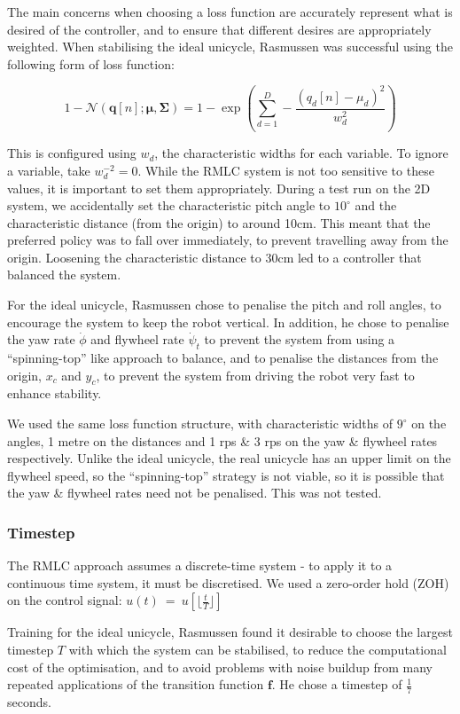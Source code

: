 \documentclass{IIBproject}
\begin{document}
The main concerns when choosing a loss function are accurately represent what
is desired of the controller, and to ensure that different desires are
appropriately weighted. When stabilising the ideal unicycle, Rasmussen was
successful using the following form of loss function:

\[
  1 - \mathcal{N}(\boldsymbol{q}[n]; \boldsymbol{\mu}, \boldsymbol{\Sigma})
  = 1 - \exp\left(\sum_{d=1}^D - \frac{(q_d[n] - \mu_d)^2}{w_d^2}\right)
\]

This is configured using $w_d$, the characteristic widths for each variable.
To ignore a variable, take $w_d^{-2} = 0$. While the RMLC system is not too
sensitive to these values, it is important to set them appropriately. During a
test run on the 2D system, we accidentally set the characteristic pitch angle
to $10^\circ$ and the characteristic distance (from the origin) to around
10cm. This meant that the preferred policy was to fall over immediately, to
prevent travelling away from the origin. Loosening the characteristic distance
to 30cm led to a controller that balanced the system.

For the ideal unicycle, Rasmussen chose to penalise the pitch and roll angles,
to encourage the system to keep the robot vertical.  In addition, he chose to
penalise the yaw rate $\dot{\phi}$ and flywheel rate $\dot{\psi}_t$ to prevent
the system from using a ``spinning-top'' like approach to balance, and to
penalise the distances from the origin, $x_c$ and $y_c$, to prevent the system
from driving the robot very fast to enhance stability.

We used the same loss function structure, with characteristic widths of
$9^\circ$ on the angles, 1 metre on the distances and 1 rps \& 3 rps on the
yaw \& flywheel rates respectively. Unlike the ideal unicycle, the real
unicycle has an upper limit on the flywheel speed, so the ``spinning-top''
strategy is not viable, so it is possible that the yaw \& flywheel rates need
not be penalised. This was not tested.

\subsubsection{Timestep}

The RMLC approach assumes a discrete-time system - to apply it to a continuous
time system, it must be discretised. We used a zero-order hold (ZOH) on the
control signal: $u(t)~=~u[\lfloor\frac{t}{T}\rfloor]$

Training for the ideal unicycle, Rasmussen found it desirable to choose the
largest timestep $T$ with which the system can be stabilised, to reduce the
computational cost of the optimisation, and to avoid problems with noise
buildup from many repeated applications of the transition function
$\boldsymbol{f}$. He chose a timestep of $\frac{1}{7}$ seconds.
\end{document}
